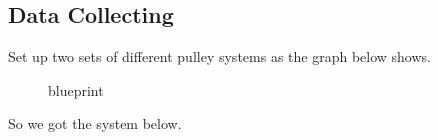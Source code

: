 \documentclass[12pt,a4paper]{article}
\begin{document}
\begin{spacing}{1.25}
\subsection{Data Collecting}
Set up two sets of different pulley systems as the graph below shows. \par
\begin{figure}[h]
    \centering
    \caption{blueprint}
    \vspace{-0.5cm}
\end{figure}
So we got the system below.
\begin{figure}[h]
    \centering

\end{figure}
\end{spacing}
\end{document}
